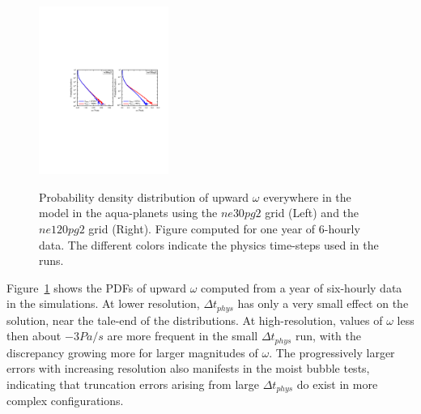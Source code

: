\begin{figure}[t]
\begin{center}
\noindent\includegraphics[width=10pc,angle=0]{chapter5/panel_pdf_dtphys.pdf}\\
\end{center}
\caption{Probability density distribution of upward $\omega$ everywhere in the model in the aqua-planets using the $ne30pg2$ grid (Left) and the $ne120pg2$ grid (Right). Figure computed for one year of 6-hourly data. The different colors indicate the physics time-steps used in the runs.}
\label{fig:pdf-dtphys}
\end{figure}

Figure~\ref{fig:pdf-dtphys} shows the PDFs of upward $\omega$ computed from a year of six-hourly data in the simulations. At lower resolution, $\Delta t_{phys}$ has only a very small effect on the solution, near the tale-end of the distributions. At high-resolution, values of $\omega$ less then about $-3 Pa/s$ are more frequent in the small $\Delta t_{phys}$ run, with the discrepancy growing more for larger magnitudes of $\omega$. The progressively larger errors with increasing resolution also manifests in the moist bubble tests, indicating that truncation errors arising from large $\Delta t_{phys}$ do exist in more complex configurations.

